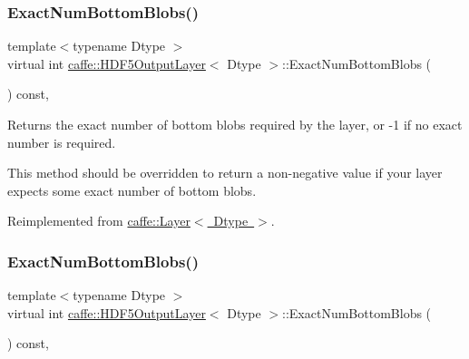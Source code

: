 \subsubsection{\texorpdfstring{Exact\+Num\+Bottom\+Blobs()}{ExactNumBottomBlobs()}\hspace{0.1cm}{\footnotesize\ttfamily [1/2]}}
{\footnotesize\ttfamily template$<$typename Dtype $>$ \\
virtual int \mbox{\hyperlink{classcaffe_1_1_h_d_f5_output_layer}{caffe\+::\+H\+D\+F5\+Output\+Layer}}$<$ Dtype $>$\+::Exact\+Num\+Bottom\+Blobs (\begin{DoxyParamCaption}{ }\end{DoxyParamCaption}) const\hspace{0.3cm}{\ttfamily [inline]}, {\ttfamily [virtual]}}



Returns the exact number of bottom blobs required by the layer, or -\/1 if no exact number is required. 

This method should be overridden to return a non-\/negative value if your layer expects some exact number of bottom blobs. 

Reimplemented from \mbox{\hyperlink{classcaffe_1_1_layer_a8e5ee0494d85f5f55fc4396537cbc60f}{caffe\+::\+Layer$<$ Dtype $>$}}.

\mbox{\label{classcaffe_1_1_h_d_f5_output_layer_a92fb5561414d7e8b8845b0279b1ee847}} 
\subsubsection{\texorpdfstring{Exact\+Num\+Bottom\+Blobs()}{ExactNumBottomBlobs()}\hspace{0.1cm}{\footnotesize\ttfamily [2/2]}}
{\footnotesize\ttfamily template$<$typename Dtype $>$ \\
virtual int \mbox{\hyperlink{classcaffe_1_1_h_d_f5_output_layer}{caffe\+::\+H\+D\+F5\+Output\+Layer}}$<$ Dtype $>$\+::Exact\+Num\+Bottom\+Blobs (\begin{DoxyParamCaption}{ }\end{DoxyParamCaption}) const\hspace{0.3cm}{\ttfamily [inline]}, {\ttfamily [virtual]}}



